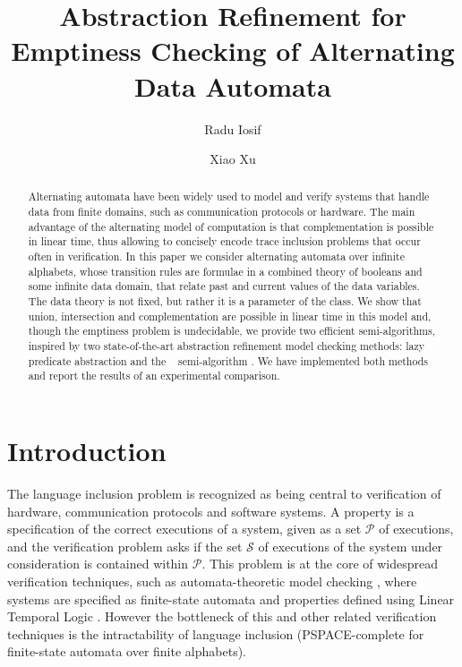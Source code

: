 \documentclass[10pt]{llncs}
\begin{document}

\title{Abstraction Refinement for Emptiness Checking of Alternating
  Data Automata}

\author{Radu Iosif \and Xiao Xu}

\maketitle

\begin{abstract}
Alternating automata have been widely used to model and verify systems
that handle data from finite domains, such as communication protocols
or hardware. The main advantage of the alternating model of
computation is that complementation is possible in linear time, thus
allowing to concisely encode trace inclusion problems that occur often
in verification. In this paper we consider alternating automata over
infinite alphabets, whose transition rules are formulae in a combined
theory of booleans and some infinite data domain, that relate past and
current values of the data variables. The data theory is not fixed,
but rather it is a parameter of the class. We show that union,
intersection and complementation are possible in linear time in this
model and, though the emptiness problem is undecidable, we provide two
efficient semi-algorithms, inspired by two state-of-the-art
abstraction refinement model checking methods: lazy predicate
abstraction \cite{HJMS02} and the \impact~ semi-algorithm
\cite{mcmillan06}. We have implemented both methods and report the
results of an experimental comparison.
\end{abstract}

\section{Introduction}

The language inclusion problem is recognized as being central to
verification of hardware, communication protocols and software
systems. A property is a specification of the correct executions of a
system, given as a set $\mathcal{P}$ of executions, and the
verification problem asks if the set $\mathcal{S}$ of executions of
the system under consideration is contained within $\mathcal{P}$.
This problem is at the core of widespread verification techniques,
such as automata-theoretic model checking \cite{VARDI94}, where
systems are specified as finite-state automata and properties defined
using Linear Temporal Logic \cite{Pnueli77}. However the bottleneck of
this and other related verification techniques is the intractability
of language inclusion (PSPACE-complete for finite-state automata over
finite alphabets).
\end{document}
